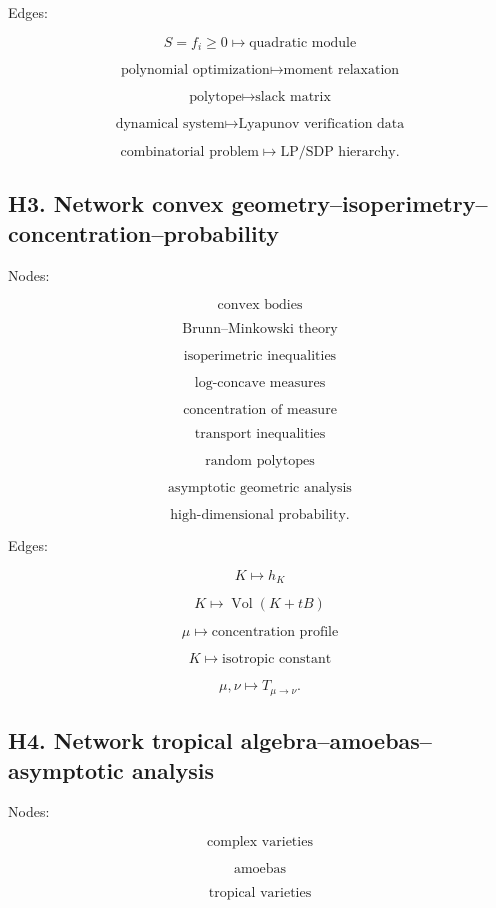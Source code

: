 \documentclass[11pt]{article}
\begin{document}
Edges:

\[
S={f_i\ge 0}\mapsto \text{quadratic module}
\]

\[
\text{polynomial optimization}\mapsto \text{moment relaxation}
\]

\[
\text{polytope}\mapsto \text{slack matrix}
\]

\[
\text{dynamical system}\mapsto \text{Lyapunov verification data}
\]

\[
\text{combinatorial problem}\mapsto \text{LP/SDP hierarchy}.
\]



\subsection{H3. Network convex geometry--isoperimetry--concentration--probability}

Nodes:

\[
\text{convex bodies}
\]

\[
\text{Brunn--Minkowski theory}
\]

\[
\text{isoperimetric inequalities}
\]

\[
\text{log-concave measures}
\]

\[
\text{concentration of measure}
\]

\[
\text{transport inequalities}
\]

\[
\text{random polytopes}
\]

\[
\text{asymptotic geometric analysis}
\]

\[
\text{high-dimensional probability}.
\]

Edges:

\[
K\mapsto h_K
\]

\[
K\mapsto \operatorname{Vol}(K+tB)
\]

\[
\mu\mapsto \text{concentration profile}
\]

\[
K\mapsto \text{isotropic constant}
\]

\[
\mu,\nu\mapsto T_{\mu\to\nu}.
\]



\subsection{H4. Network tropical algebra--amoebas--asymptotic analysis}

Nodes:

\[
\text{complex varieties}
\]

\[
\text{amoebas}
\]

\[
\text{tropical varieties}
\]
\end{document}
